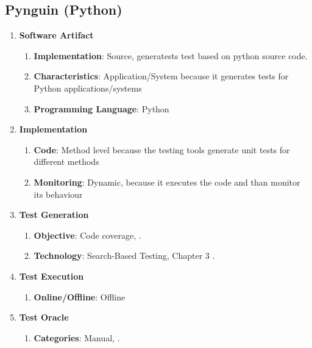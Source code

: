 \documentclass{article}
\begin{document}
\subsection{Pynguin (Python)}
\begin{enumerate}
    \item \textbf{Software Artifact}
    \begin{enumerate}
        \item \textbf{Implementation}: Source, generatests test based on python source code.
        \item \textbf{Characteristics}: Application/System because it generates tests for Python applications/systems
        \item \textbf{Programming Language}: Python
    \end{enumerate}
    \item \textbf{Implementation}
    \begin{enumerate}
        \item \textbf{Code}: Method level because the testing tools generate unit tests for different methods
        \item \textbf{Monitoring}: Dynamic, because it executes the code and than monitor its behaviour
    \end{enumerate}
    \item \textbf{Test Generation}
    \begin{enumerate}
        \item \textbf{Objective}: Code coverage,  \cite{lukasczyk2020automated}.
        \item \textbf{Technology}: Search-Based Testing, Chapter 3 \cite{lukasczyk2020automated}.
    \end{enumerate}
    \item \textbf{Test Execution}
    \begin{enumerate}
        \item \textbf{Online/Offline}: Offline
    \end{enumerate}
    \item \textbf{Test Oracle}
    \begin{enumerate}
        \item \textbf{Categories}: Manual,  \cite{lukasczyk2020automated}.
    \end{enumerate}
\end{enumerate}
\end{document}
